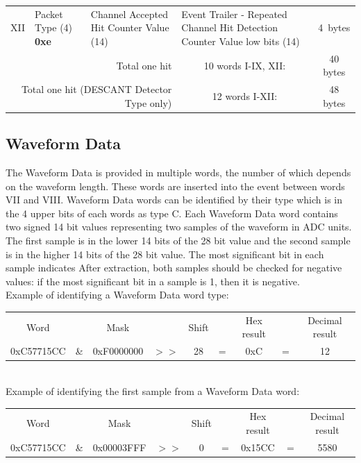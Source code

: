 \documentclass[letterpaper,12pt,notitlepage]{report}
\begin{document}
\begin{landscape}
\begin{table}
\begin{tabular*}{\textwidth}{p{0.9cm}|p{2.25cm}|p{2.2cm}|p{2.2cm}|p{2.2cm}|p{2.2cm}|p{2.2cm}|p{2.2cm}|p{2.2cm}|c}
\cline{2-9}
XII & Packet Type (4) {\bf 0xe} & \multicolumn{3}{p{6.6cm}|}{Channel Accepted Hit Counter Value (14)} & \multicolumn{4}{p{8.8cm}|}{Event Trailer - Repeated Channel Hit Detection Counter Value low bits (14)} & 4~bytes\\
\cline{2-9}
\multicolumn{7}{r}{Total one hit} & \multicolumn{2}{c}{10 words I-IX, XII:} & 40 bytes\\
\multicolumn{7}{r}{Total one hit (DESCANT Detector Type only)} & \multicolumn{2}{c}{12 words I-XII:} & 48 bytes\\
\end{tabular*}
\end{table}
\end{landscape}

\subsection{Waveform Data}
The Waveform Data is provided in multiple words, the number of which depends on the waveform length. These words are inserted into the event between words VII and VIII. Waveform Data words can be identified by their type which is in the 4 upper bits of each words as type C. Each Waveform Data word contains two signed 14 bit values representing two samples of the waveform in ADC units. The first sample is in the lower 14 bits of the 28 bit value and the second sample is in the higher 14 bits of the 28 bit value. The most significant bit in each sample indicates  After extraction, both samples should be checked for negative values: if the most significant bit in a sample is 1, then it is negative.\\

 Example of identifying a Waveform Data word type:\\

\begin{tabular}{ccccccccc}
Word &  & Mask & & Shift & & Hex result & & Decimal result\\
0xC57715CC & \& & 0xF0000000 & $>>$ & 28 & = & 0xC & = & 12\\
\end{tabular}\\

 Example of identifying the first sample from a Waveform Data word:\\

\begin{tabular}{ccccccccc}
Word &  & Mask & & Shift & & Hex result & & Decimal result\\
0xC57715CC & \& & 0x00003FFF & $>>$ & 0 & = & 0x15CC & = & 5580\\
\end{tabular}\\
\end{document}
